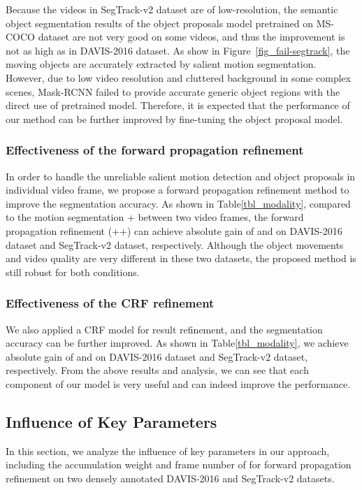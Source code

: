 \documentclass[journal]{IEEEtran}
\makeatletter
\newcommand{\fig}{{Figure}\@\xspace}
\newcommand{\tab}{{Table}\@\xspace}
\makeatother
\begin{document}
Because the videos in SegTrack-v2 dataset are of low-resolution, 
the semantic object segmentation results of the object proposals model pretrained on MS-COCO dataset \cite{ECCV2014_Lin} are not very good on some videos, and thus the improvement is not as high as in DAVIS-2016 dataset.
As show in \fig~\ref{fig_fail-segtrack}, the moving objects are accurately extracted by salient motion segmentation.
However, due to low video resolution and cluttered background in some complex scenes,
Mask-RCNN \cite{ICCV2017_He} failed to provide accurate generic object regions with the direct use of pretrained model.
Therefore, it is expected that the performance of our method can be further improved by fine-tuning the object proposal model. 

\subsubsection{Effectiveness of the forward propagation refinement}
In order to handle the unreliable salient motion detection and object proposals in individual video frame,
we propose a forward propagation refinement method to improve the segmentation accuracy. 
As shown in \tab \ref{tbl_modality},
compared to the motion segmentation + between two video frames,
the forward propagation refinement (++) can achieve absolute gain of  and  on DAVIS-2016 dataset and SegTrack-v2 dataset, respectively. 
Although the object movements and video quality are very different in these two datasets, 
the proposed method is still robust for both conditions.

\subsubsection{Effectiveness of the CRF refinement}
We also applied a CRF model for result refinement, and the segmentation accuracy can be further improved.
As shown in \tab \ref{tbl_modality}, we achieve absolute gain of  and  on DAVIS-2016 dataset and SegTrack-v2 dataset, respectively.
From the above results and analysis, we can see that each component of our model is very useful and can indeed improve the performance.

\subsection{Influence of Key Parameters}
\label{sec:exp-param}
In this section, we analyze the influence of key parameters in our approach, including the accumulation weight  and frame number of  for forward propagation refinement on two densely annotated DAVIS-2016 and SegTrack-v2 datasets. 
\end{document}
